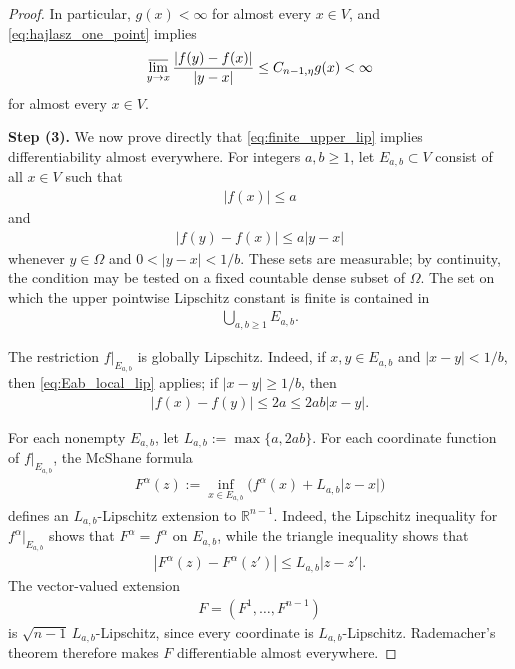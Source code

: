 \documentclass[11pt]{amsart}
\theoremstyle{plain}
\theoremstyle{plain}
\theoremstyle{plain}
\newcommand{\R}{\mathbb R}
\numberwithin{equation}{section}
\begin{document}
\begin{proof}
In particular, \(g(x)<\infty\) for almost every \(x\in V\), and
\eqref{eq:hajlasz_one_point} implies
\begin{align}
\varlimsup_{y\to x}
\frac{|f(y)-f(x)|}{|y-x|}
\leq C_{n-1,\eta}g(x)<\infty
\label{eq:finite_upper_lip}
\end{align}
for almost every \(x\in V\).

\textbf{Step (3).} We now prove directly that \eqref{eq:finite_upper_lip} implies  
differentiability almost everywhere.  For integers \(a,b\geq1\), let
\(E_{a,b}\subset V\) consist of all \(x\in V\) such that
\begin{align}
|f(x)|\leq a\nonumber
\end{align}
and
\begin{align}
|f(y)-f(x)|\leq a|y-x|
\label{eq:Eab_local_lip}
\end{align}
whenever \(y\in\Omega\) and \(0<|y-x|<1/b\).  These sets are measurable;
by continuity, the condition may be tested on a fixed countable dense
subset of \(\Omega\).  The set on which the upper pointwise Lipschitz
constant is finite is contained in
\begin{align}
\bigcup_{a,b\geq1}E_{a,b}.\nonumber
\end{align}

The restriction \(f|_{E_{a,b}}\) is globally Lipschitz.  Indeed, if
\(x,y\in E_{a,b}\) and \(|x-y|<1/b\), then
\eqref{eq:Eab_local_lip} applies; if \(|x-y|\geq1/b\), then
\begin{align}
|f(x)-f(y)|\leq2a\leq2ab|x-y|.\nonumber
\end{align}

For each nonempty
\(E_{a,b}\), let \(L_{a,b}:=\max\{a,2ab\}\).  For each coordinate function of
\(f|_{E_{a,b}}\), the McShane formula
\begin{align}
F^\alpha(z)
:=
\inf_{x\in E_{a,b}}
\bigl(f^\alpha(x)+L_{a,b}|z-x|\bigr)\nonumber
\end{align}
defines an \(L_{a,b}\)-Lipschitz extension to \(\R^{n-1}\).  Indeed, the
Lipschitz inequality for \(f^\alpha|_{E_{a,b}}\) shows that
\(F^\alpha=f^\alpha\) on \(E_{a,b}\), while the triangle inequality
shows that
\begin{align}
|F^\alpha(z)-F^\alpha(z')|\leq L_{a,b}|z-z'|.\nonumber
\end{align}
The vector-valued extension
\begin{align}
F=(F^1,\dots,F^{n-1})\nonumber
\end{align}
is \(\sqrt{n-1}\,L_{a,b}\)-Lipschitz, since every coordinate is
\(L_{a,b}\)-Lipschitz.  Rademacher's theorem therefore makes \(F\)
  differentiable almost everywhere.


\end{proof}
\end{document}
